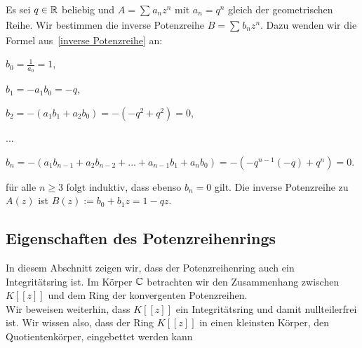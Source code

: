 %
\begin{bsp} %
Es sei $q \in \mathbb{R}$ beliebig und $A = \sum_{}^{}a_n z^n$ mit $a_n = q^n$ gleich der geometrischen Reihe. Wir bestimmen die inverse Potenzreihe $B = \sum_{}^{} b_n z^n$. Dazu wenden wir die Formel aus~\ref{inverse Potenzreihe} an:
\begin{center}
\begin{description}
\item $b_0 = \frac{1}{a_0} = 1$,
\item $b_1 = -a_1b_0 = -q$,
\item $b_2 = -\left(a_1b_1 + a_2b_0\right) = -\left(-q^2 + q^2\right) = 0$,
\item ...
\item $b_n = -\left(a_1b_{n-1} + a_2b_{n-2} + ... + a_{n-1}b_1 + a_nb_0\right) = -\left(-q^{n-1}(-q) + q^n\right) = 0$.
\end{description}
\end{center}
für alle $n \ge 3$ folgt induktiv, dass ebenso $b_n = 0$ gilt. Die inverse Potenzreihe zu $A(z)$ ist $B(z) := b_0 + b_1z = 1 - qz$. 
\end{bsp}
%
\subsection{Eigenschaften des Potenzreihenrings}
In diesem Abschnitt zeigen wir, dass der Potenzreihenring auch ein Integritätsring ist. Im Körper $\mathbb{C}$ betrachten wir den Zusammenhang zwischen $K[[z]]$ und dem Ring der konvergenten Potenzreihen. \\
Wir beweisen weiterhin, dass $K[[z]]$ ein Integritätsring und damit nullteilerfrei ist. Wir wissen also, dass der Ring $K[[z]]$ in einen kleinsten Körper, den Quotientenkörper, eingebettet werden kann
%

